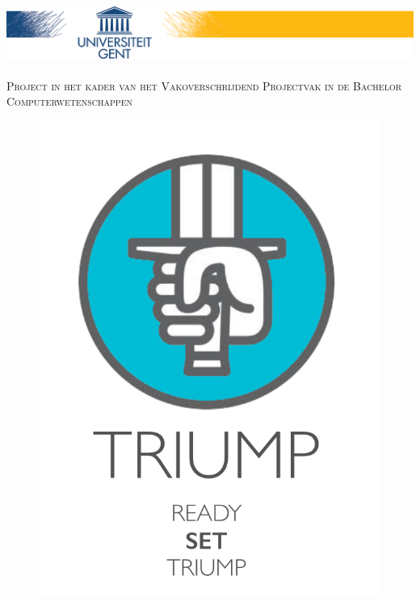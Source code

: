 \documentclass[a4paper,11.5pt]{report}
\begin{document}



\begin{titlepage}
\begin{center}

\includegraphics[width=\linewidth]{ugent}~\\[2.0cm]

\textsc{Project in het kader van het Vakoverschrijdend Projectvak in de Bachelor Computerwetenschappen}\\[1.0cm]




\begin{figure}[H]
	\centering
	\includegraphics[scale=0.25]{ready}
	\label{fig:titelblad}
	

\end{figure}
\end{center}
\end{titlepage}
\end{document}
